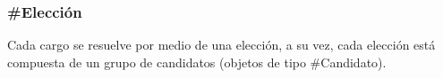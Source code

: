 \subsubsection{\#Elección}

Cada cargo se resuelve por medio de una elección, a su vez, cada
elección está compuesta de un grupo de candidatos (objetos de tipo
\#Candidato).

\begin{description}
  
\end{description}
